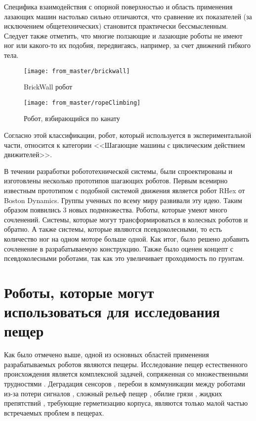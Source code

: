  Специфика взаимодействия с опорной поверхностью и область применения лазающих машин настолько сильно отличаются, что сравнение их показателей (за исключением общетехнических) становится практически бессмысленным. Следует также отметить, что многие ползающие и лазающие роботы не имеют ног или какого-то их подобия, передвигаясь, например, за счет движений гибкого тела.

\begin{figure}[H]
\centering\texttt{[image: from\_master/brickwall]}
\caption{BrickWall робот}
\label{fig:brickwall}
\end{figure}

\begin{figure}[H]
\centering\texttt{[image: from\_master/ropeClimbing]}
\caption{Робот, взбирающийся по канату}
\label{fig:ropeClimbing}
\end{figure}

Согласно этой классификации, робот, который используется в экспериментальной части, относится к категории <<Шагающие машины с циклическим действием движителей>>.

В течении разработки робототехнической системы, были спроектированы и изготовлены несколько прототипов шагающих роботов. Первым всемирно известным прототипом с подобной системой движения является робот RHex \cite{saranliRHexSimpleHighly2001} от Boston Dynamics. Группы ученных по всему миру развивали эту идею. Таким образом появились 3 новых подмножества. Роботы, которые умеют много сочленений. Системы, которые могут трансформироваться в колесных роботов и обратно. А также системы, которые являются псевдоколесными, то есть количество ног на одном моторе больше одной. Как итог, было решено добавить сочленение в разрабатываемую конструкцию. Также было оценен концепт с псевдоколесными роботами, так как это увеличивает проходимость по грунтам.

\section{Роботы, которые могут использоваться для исследования пещер}

Как было отмечено выше, одной из основных областей применения разрабатываемых роботов являются пещеры. Исследование пещер естественного происхождения является комплексной задачей, сопряженная со множественными трудностями \cite{Zhang2017a, Frumkin2019}. Деградация сенсоров \cite{Huang2019}, перебои в коммуникации между роботами из-за потери сигналов \cite{Vaquero2018, Thangavelautham2017}, сложный рельеф пещер \cite{Thangavelautham2017}, обилие грязи \cite{Baker2004}, жидких препятствий \cite{Morris2006}, требующие герметизацию корпуса, являются только малой частью встречаемых проблем в пещерах. 

